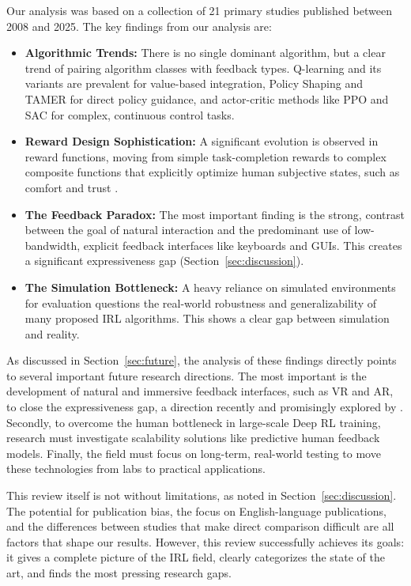 \documentclass[rnd]{mas_proposal}
\begin{document}
Our analysis was based on a collection of 21 primary studies published between 2008 and 2025. The key findings from our analysis are:
\begin{itemize}
\item \textbf{Algorithmic Trends:} There is no single dominant algorithm, but a clear trend of pairing algorithm classes with feedback types. Q-learning and its variants are prevalent for value-based integration, Policy Shaping and TAMER for direct policy guidance, and actor-critic methods like PPO and SAC for complex, continuous control tasks.
\item \textbf{Reward Design Sophistication:} A significant evolution is observed in reward functions, moving from simple task-completion rewards to complex composite functions that explicitly optimize human subjective states, such as comfort \citep{GonzalezSantocildes2024} and trust \citep{Alzahrani2025}.
\item \textbf{The Feedback Paradox:} The most important finding is the strong, contrast between the goal of natural interaction and the predominant use of low-bandwidth, explicit feedback interfaces like keyboards and GUIs. This creates a significant expressiveness gap (Section~\ref{sec:discussion}).
\item \textbf{The Simulation Bottleneck:} A heavy reliance on simulated environments for evaluation questions the real-world robustness and generalizability of many proposed IRL algorithms. This shows a clear gap between simulation and reality.
\end{itemize}

As discussed in Section~\ref{sec:future}, the analysis of these findings directly points to several important future research directions. The most important is the development of natural and immersive feedback interfaces, such as VR and AR, to close the expressiveness gap, a direction recently and promisingly explored by \citet{Heuvel2025}. Secondly, to overcome the human bottleneck in large-scale Deep RL training, research must investigate scalability solutions like predictive human feedback models. Finally, the field must focus on long-term, real-world testing to move these technologies from labs to practical applications.

This review itself is not without limitations, as noted in Section~\ref{sec:discussion}. The potential for publication bias, the focus on English-language publications, and the differences between studies that make direct comparison difficult are all factors that shape our results. However, this review successfully achieves its goals: it gives a complete picture of the IRL field, clearly categorizes the state of the art, and finds the most pressing research gaps.
\end{document}
